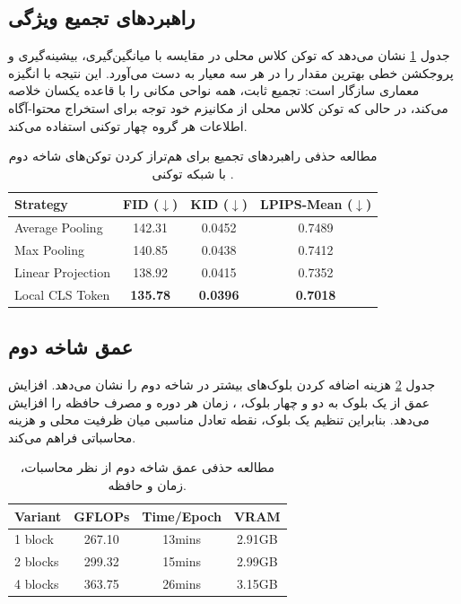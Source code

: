 \subsection{راهبردهای تجمیع ویژگی}
جدول \ref{tab:ablation_pooling} نشان می‌دهد که توکن کلاس محلی در مقایسه با میانگین‌گیری، بیشینه‌گیری و پروجکشن خطی بهترین مقدار را در هر سه معیار به دست می‌آورد. این نتیجه با انگیزه معماری سازگار است: تجمیع ثابت، همه نواحی مکانی را با قاعده یکسان خلاصه می‌کند، در حالی که توکن کلاس محلی از مکانیزم خود توجه برای استخراج محتوا-آگاه اطلاعات هر گروه چهار توکنی استفاده می‌کند.

\begin{table}[htbp]
    \centering
    \caption[مطالعه حذفی راهبردهای تجمیع]{مطالعه حذفی راهبردهای تجمیع برای هم‌تراز کردن توکن‌های شاخه دوم با شبکه توکنی .}
    \label{tab:ablation_pooling}
    \begin{latin}
    \begin{tabular}{lccc}
        \hline
        \textbf{Strategy} & \textbf{FID} ($\downarrow$) & \textbf{KID} ($\downarrow$) & \textbf{LPIPS-Mean} ($\downarrow$) \\
        \hline
        Average Pooling & 142.31 & 0.0452 & 0.7489 \\
        Max Pooling & 140.85 & 0.0438 & 0.7412 \\
        Linear Projection & 138.92 & 0.0415 & 0.7352 \\
        Local CLS Token & \textbf{135.78} & \textbf{0.0396} & \textbf{0.7018} \\
        \hline
    \end{tabular}
    \end{latin}
\end{table}

\subsection{عمق شاخه دوم}
جدول \ref{tab:ablation_blocks} هزینه اضافه کردن بلوک‌های بیشتر در شاخه دوم را نشان می‌دهد. افزایش عمق از یک بلوک به دو و چهار بلوک، ، زمان هر دوره و مصرف حافظه را افزایش می‌دهد. بنابراین تنظیم یک بلوک، نقطه تعادل مناسبی میان ظرفیت محلی و هزینه محاسباتی فراهم می‌کند.

\begin{table}[htbp]
    \centering
    \caption[مطالعه حذفی عمق شاخه دوم]{مطالعه حذفی عمق شاخه دوم از نظر محاسبات، زمان و حافظه.}
    \label{tab:ablation_blocks}
    \begin{latin}
    \begin{tabular}{lccc}
        \hline
        \textbf{Variant} & \textbf{GFLOPs} & \textbf{Time/Epoch} & \textbf{VRAM} \\
        \hline
        1 block & 267.10 & 13mins & 2.91GB \\
        2 blocks & 299.32 & 15mins & 2.99GB \\
        4 blocks & 363.75 & 26mins & 3.15GB \\
        \hline
    \end{tabular}
    \end{latin}
\end{table}

